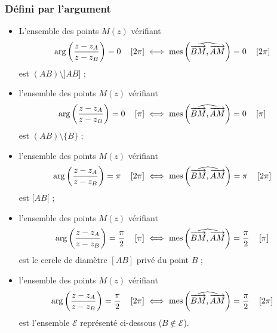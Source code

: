 \begin{fiche}
            \subsubsection*{D\'efini par l'argument}
                  \begin{itemize}
	                        \item L'ensemble des points $M(z)$ v\'erifiant
	                              \[
	                                    \mathrm{arg}\left( \frac{z-z_A}{z-z_B} \right) = 0 \quad \left[ 2\pi \right]
	                                          \iff
	                                    \mathrm{mes}\left( \widehat{ \overrightarrow{BM} , \overrightarrow{AM} } \right) = 0 \quad \left[ 2\pi \right]
	                              \]
                              est
                              $(AB) \setminus ]AB]$ ;
	                        \item l'ensemble des points $M(z)$ v\'erifiant
	                              \[
	                                    \mathrm{arg}\left( \frac{z-z_A}{z-z_B} \right) = 0 \quad \left[ \pi \right]
	                                          \iff
	                                    \mathrm{mes}\left( \widehat{ \overrightarrow{BM} , \overrightarrow{AM} } \right) = 0 \quad \left[ \pi \right]
	                              \]
                              est
                              $(AB) \setminus \{B\}$ ;
	                        \item l'ensemble des points $M(z)$ v\'erifiant
	                              \[
	                                    \mathrm{arg}\left( \frac{z-z_A}{z-z_B} \right) = \pi \quad \left[ 2\pi \right]
	                                          \iff
	                                    \mathrm{mes}\left( \widehat{ \overrightarrow{BM} , \overrightarrow{AM} } \right) = \pi \quad \left[ 2\pi \right]
	                              \]
                              est 
                              $[AB[$ ;
	                        \item l'ensemble des points $M(z)$ v\'erifiant
	                              \[
	                                    \mathrm{arg}\left( \frac{z-z_A}{z-z_B} \right) = \frac{\pi}{2} \quad \left[ \pi \right]
	                                          \iff
	                                    \mathrm{mes}\left( \widehat{ \overrightarrow{BM} , \overrightarrow{AM} } \right) = \frac{\pi}{2} \quad \left[ \pi \right]
	                              \]
                              est
                              le cercle de diam\`etre $[AB]$ priv\'e du point $B$ ;
	                        \item l'ensemble des points $M(z)$ v\'erifiant
	                              \[
	                                    \mathrm{arg}\left( \frac{z-z_A}{z-z_B} \right) = \frac{\pi}{2} \quad \left[ 2\pi \right]
	                                          \iff
	                                    \mathrm{mes}\left( \widehat{ \overrightarrow{BM} , \overrightarrow{AM} } \right) = \frac{\pi}{2} \quad \left[ 2\pi \right]
	                              \]
                              est
                              l'ensemble $\mathscr{E}$ repr\'esent\'e ci-dessous ($B\not\in\mathscr{E}$).
                              

\end{itemize}
\end{fiche}
